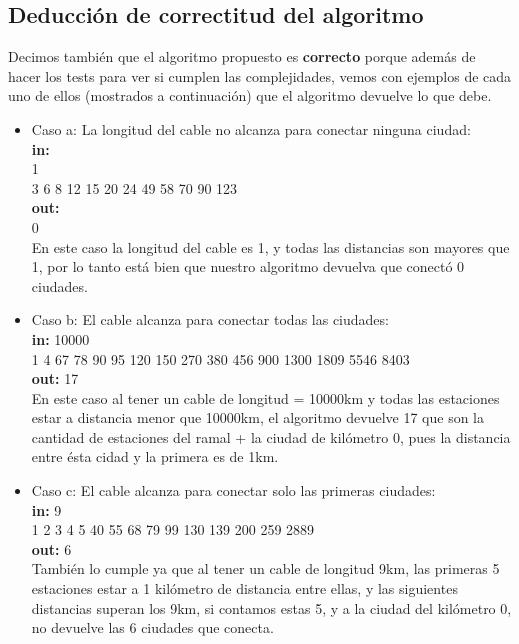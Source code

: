 \subsection{Deducción de correctitud del algoritmo}

Decimos también que el algoritmo propuesto es \textbf{correcto} porque además de hacer los tests para ver si cumplen las complejidades, vemos con ejemplos de cada uno de ellos (mostrados a continuación) que el algoritmo devuelve lo que debe.\\

\begin{itemize}
\item Caso a: La longitud del cable no alcanza para conectar ninguna ciudad:\\
\textbf{in:}\\
1\\
3 6 8 12 15 20 24 49 58 70 90 123 \\
\textbf{out:}\\
0\\

En este caso la longitud del cable es 1, y todas las distancias son mayores que 1, por lo tanto está bien que nuestro algoritmo devuelva que conectó 0 ciudades.\\

\item Caso b: El cable alcanza para conectar todas las ciudades:\\
\textbf{in:}
10000\\
1 4 67 78 90 95 120 150 270 380 456 900 1300 1809 5546 8403\\
\textbf{out:}
17\\

En este caso al tener un cable de longitud = 10000km y todas las estaciones estar a distancia menor que 10000km, el algoritmo devuelve 17 que son la cantidad de estaciones del ramal + la ciudad de kilómetro 0, pues la distancia entre ésta cidad y la primera es de 1km. \\

\item Caso c: El cable alcanza para conectar solo las primeras ciudades:\\
\textbf{in:}
9\\
1 2 3 4 5 40 55 68 79 99 130 139 200 259 2889\\
\textbf{out:}
6\\

También lo cumple ya que al tener un cable de longitud 9km, las primeras 5 estaciones estar a 1 kilómetro de distancia entre ellas, y las siguientes distancias superan los 9km, si contamos estas 5, y a la ciudad del kilómetro 0, no devuelve las 6 ciudades que conecta.\\


\end{itemize}
